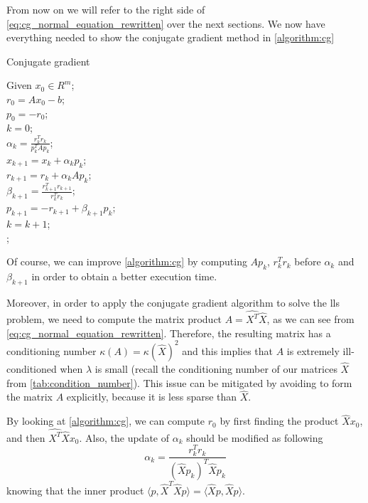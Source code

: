 \noindent From now on we will refer to the right side of \eqref{eq:cg_normal_equation_rewritten} over the next sections. We now have everything needed to show the conjugate gradient method in \autoref{algorithm:cg}

\begin{algorithm}[H]
    \caption{Conjugate gradient}
    \label{algorithm:cg}
    Given $x_0 \in R^m$;\\
    $r_0=Ax_0-b$;\\
    $p_0=-r_0$;\\
    $k=0$;\\
     {
        $\alpha_k =  \frac{r_k^Tr_k}{p_k^TAp_k}$;\\
        $x_{k+1} = x_k + \alpha_kp_k$;\\
        $r_{k+1} = r_k + \alpha_kAp_k$;\\
        $\beta_{k+1} = \frac{r^T_{k+1}r_{k+1}}{r^T_kr_k}$;\\
        $p_{k+1}=-r_{k+1}+\beta_{k+1}p_k$;\\
        $k=k+1$;\\
    }
    ;
\end{algorithm}

\noindent Of course, we can improve \autoref{algorithm:cg} by computing $Ap_k$, $r^T_kr_k$ before $\alpha_k$ and $\beta_{k+1}$ in order to obtain a better execution time.
\vspace{3mm}

\noindent Moreover, in order to apply the conjugate gradient algorithm to solve the lls problem, we need to compute the matrix product $A = \hat{X^T}\hat{X}$, as we can see from \eqref{eq:cg_normal_equation_rewritten}. Therefore, the resulting matrix has a conditioning number $\kappa(A) = \kappa(\hat{X})^2$ and this implies that $A$ is extremely ill-conditioned when $\lambda$ is small (recall the conditioning number of our matrices $\hat{X}$ from \autoref{tab:condition_number}). This issue can be mitigated by avoiding to form the matrix $A$ explicitly, because it is less sparse than $\hat{X}$.
\vspace{3mm}

\noindent By looking at \autoref{algorithm:cg}, we can compute $r_0$ by first finding the product $\hat{X}x_{0}$, and then $\hat{X^T}\hat{X}x_{0}$. Also, the update of $\alpha_k$ should be modified as following
\begin{equation}
    \alpha_k =  \frac{r_k^Tr_k}{(\hat{X}p_k)^{T}\hat{X}p_k}
    \label{eq:cg_rewritten_alpha}
\end{equation}
knowing that the inner product $\langle p, \hat{X}^T \hat{X} p \rangle = \langle \hat{X}p, \hat{X}p \rangle$.
\vspace{3mm}

